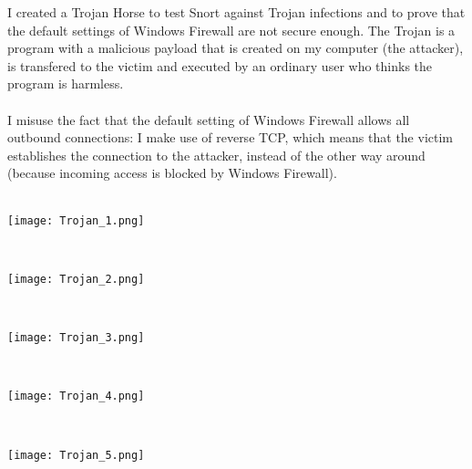 I created a Trojan Horse to test Snort against Trojan infections and to prove that the default settings of Windows Firewall are not secure enough. The Trojan is a program with a malicious payload that is created on my computer (the attacker), is transfered to the victim and executed by an ordinary user who thinks the program is harmless. \\ \\
I misuse the fact that the default setting of Windows Firewall allows all outbound connections: I make use of reverse TCP, which means that the victim establishes the connection to the attacker, instead of the other way around (because incoming access is blocked by Windows Firewall). \\ \\
\noindent\begin{minipage}{\textwidth}
    \centering
    \texttt{[image: Trojan\_1.png]}
\end{minipage}
$\;$ \\ \\
\noindent\begin{minipage}{\textwidth}
    \centering
    \texttt{[image: Trojan\_2.png]}
\end{minipage}
$\;$ \\ \\
\noindent\begin{minipage}{\textwidth}
    \centering
    \texttt{[image: Trojan\_3.png]}
\end{minipage}
$\;$ \\ \\
\noindent\begin{minipage}{\textwidth}
    \centering
    \texttt{[image: Trojan\_4.png]}
\end{minipage}
$\;$ \\ \\
\noindent\begin{minipage}{\textwidth}
    \centering
    \texttt{[image: Trojan\_5.png]}
\end{minipage}
